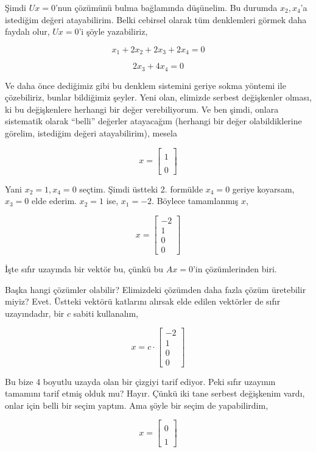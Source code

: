 \documentclass[12pt,fleqn]{article}\usepackage{../../common}
\begin{document}
Şimdi $Ux=0$'nun çözümünü bulma bağlamında düşünelim. Bu durumda
$x_2,x_4$'a istediğim değeri atayabilirim. Belki cebirsel olarak tüm
denklemleri görmek daha faydalı olur, $Ux=0$'i şöyle yazabiliriz, 

$$ x_1 + 2x_2 + 2x_3 + 2x_4 = 0 $$

$$ 2x_3 + 4x_4 = 0 $$

Ve daha önce dediğimiz gibi bu denklem sistemini geriye sokma yöntemi ile
çözebiliriz, bunlar bildiğimiz şeyler. Yeni olan, elimizde serbest
değişkenler olması, ki bu değişkenlere herhangi bir değer verebiliyorum. Ve
ben şimdi, onlara sistematik olarak ``belli'' değerler atayacağım (herhangi
bir değer olabildiklerine görelim, istediğim değeri atayabilirim), mesela

$$ x = 
\left[\begin{array}{r}
\\
1\\
\\
0
\end{array}\right]
 $$

Yani $x_2=1,x_4=0$ seçtim. Şimdi üstteki 2. formülde $x_4=0$ geriye
koyarsam, $x_3=0$ elde ederim. $x_2=1$ ise, $x_1=-2$. Böylece tamamlanmış $x$,

$$ x = 
\left[\begin{array}{r}
-2\\
1\\
0\\
0
\end{array}\right]
 $$

İşte sıfır uzayında bir vektör bu, çünkü bu $Ax=0$'in çözümlerinden biri. 

Başka hangi çözümler olabilir? Elimizdeki çözümden daha fazla çözüm
üretebilir miyiz? Evet. Üstteki vektörü katlarını alırsak elde edilen
vektörler de sıfır uzayındadır, bir $c$ sabiti kullanalım,

$$ x = 
c \cdot 
\left[\begin{array}{r}
-2\\
1\\
0\\
0
\end{array}\right]
 $$

Bu bize 4 boyutlu uzayda olan bir çizgiyi tarif ediyor. Peki sıfır
uzayının tamamını tarif etmiş olduk mu? Hayır. Çünkü iki tane serbest
değişkenim vardı, onlar için belli bir seçim yaptım. Ama şöyle bir seçim de
yapabilirdim,


$$ x = 
\left[\begin{array}{r}
\\
0\\
\\
1
\end{array}\right]
 $$
\end{document}
